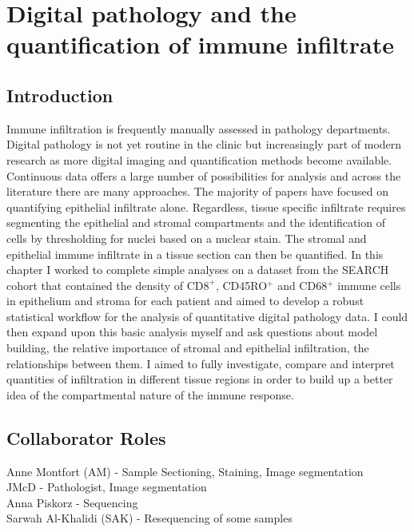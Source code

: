
\chapter{Digital pathology and the quantification of immune infiltrate}

\ifpdf
    \graphicspath{{Chapter2/Figs/Raster/}{Chapter2/Figs/PDF/}{Chapter2/Figs/}}
\else
    \graphicspath{{Chapter2/Figs/Vector/}{Chapter2/Figs/}}
\fi

\section[Introduction]{Introduction}
Immune infiltration is frequently manually assessed in pathology departments. Digital pathology is not yet routine in the clinic but increasingly part of modern research as more digital imaging and quantification methods become available. 
Continuous data offers a large number of possibilities for analysis and across the literature there are many approaches. The majority of papers have focused on quantifying epithelial infiltrate alone. Regardless, tissue specific infiltrate requires segmenting the epithelial and stromal compartments and the identification of cells by thresholding for nuclei based on a nuclear stain. The stromal and epithelial immune infiltrate in a tissue section can then be quantified.  In this chapter I worked to complete simple analyses on a dataset from the SEARCH cohort that contained the density of CD$8^+$, CD45RO$^+$ and CD68$^+$ immune cells in epithelium and stroma for each patient and aimed to develop a robust statistical workflow for the analysis of quantitative digital pathology data. I could then expand upon this basic analysis myself and ask questions about model building, the relative importance of stromal and epithelial infiltration, the relationships between them. I aimed to fully investigate, compare and interpret quantities of infiltration in different tissue regions in order to build up a better idea of the compartmental nature of the immune response.

\section{Collaborator Roles}
Anne Montfort (AM) - Sample Sectioning, Staining, Image segmentation\\
JMcD - Pathologist, Image segmentation\\
Anna Piskorz - Sequencing\\
Sarwah Al-Khalidi (SAK) - Resequencing of some samples\\

